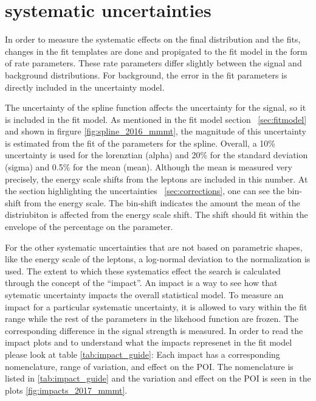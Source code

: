 \section{systematic uncertainties}
In order to measure the systematic effects on the final distribution and the fits, changes in the fit templates are done and propigated to the fit model in the form of rate parameters. These rate parameters differ slightly between the signal and background distributions. 
For background, the error in the fit parameters is directly included in the uncertainty model. 

The uncertainty of the spline function affects the uncertainty for the signal, so it is included in the fit model. 
As mentioned in the fit model section ~\ref{sec:fitmodel} and shown in firgure \ref{fig:spline_2016_mmmt}, the magnitude of this uncertainty is estimated from the fit of the parameters for the spline. Overall, a 10\% uncertainty is used for the lorenztian (alpha) and 20\% for the standard deviation (sigma) and 0.5\% for the mean (mean). Although the mean is measured very precisely, the energy scale shifts from the leptons are included in this number. At the section highlighting the uncertainties ~\ref{sec:corrections}, one can see the bin-shift from the energy scale. The bin-shift indicates the amount the mean of the distriubiton is affected from the energy scale shift. The shift should fit within the envelope of the percentage on the parameter. 


For the other systematic uncertainties that are not based on parametric shapes, like the energy scale of the leptons, a log-normal deviation to the normalization is used. 
The extent to which these systematics effect the search is calculated through the concept of the ``impact''. An impact is a way to see how that sytematic uncertainty impacts the overall statistical model. To measure an impact for a particular systematic uncertainty, it is allowed to vary within the fit range while the rest of the parameters in the likehood function are frozen. The corresponding difference in the signal strength is measured. 
In order to read the impact plots and to understand what the impacts represenet in the fit model please look at table \ref{tab:impact_guide}:
Each impact has a corresponding nomenclature, range of variation, and effect on the POI. The nomenclature is listed in \ref{tab:impact_guide} and the variation and effect on the POI is seen in the plots \ref{fig:impacts_2017_mmmt}.

